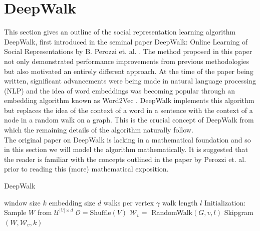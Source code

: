 \documentclass[a4paper]{article}
\begin{document}
\section{DeepWalk}
This section gives an outline of the social representation learning algorithm
DeepWalk, first introduced in the seminal paper DeepWalk: Online Learning of
Social Representations by B. Perozzi et. al. \cite{deepwalk}. The method proposed in
this paper not only demonstrated performance improvements from previous methodologies but
also motivated an entirely different approach. At the time of the paper being
written, significant advancements were being made in natural language processing (NLP)
and the idea of word embeddings was becoming popular through an embedding
algorithm known as Word2Vec \cite{mikolov2013efficient,mikolov2013distributed}.
DeepWalk implements this algorithm but replaces the idea of the context of a word in
a sentence with the context of a node in a random walk on a graph. This is the
crucial concept of DeepWalk from which the remaining details of the algorithm naturally follow.\\
The original paper on DeepWalk is lacking in a mathematical foundation and so in
this section we will model the algorithm mathematically. It is suggested that the reader
is familiar with the concepts outlined in the paper by Perozzi et. al. prior to
reading this (more) mathematical exposition.
\begin{algorithm}
  \caption{DeepWalk}
  \begin{algorithmic}[1]
    \Statex window size $k$
    \Statex embedding size $d$
    \Statex walks per vertex $\gamma$
    \Statex walk length $l$
    \State Initialization: Sample $W$ from $\mathcal{U}^{|V| \times d}$
    \State $\mathcal{O} = \text{Shuffle}(V)$
    \State $\mathcal{W}_v =$ RandomWalk$(G, v, l)$
    \State Skipgram$(W, \mathcal{W}_v, k)$
    \EndFor
    \EndFor
  \end{algorithmic}
\end{algorithm}
\end{document}
